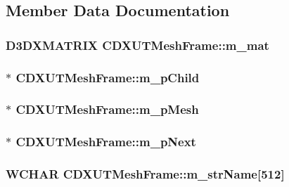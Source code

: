 \subsection{Member Data Documentation}
\hypertarget{class_c_d_x_u_t_mesh_frame_a018ba8d719db33f300d59b99bf0dfd86}{
\subsubsection[{m\_\-mat}]{\setlength{\rightskip}{0pt plus 5cm}D3DXMATRIX {\bf CDXUTMeshFrame::m\_\-mat}}}
\label{class_c_d_x_u_t_mesh_frame_a018ba8d719db33f300d59b99bf0dfd86}
\hypertarget{class_c_d_x_u_t_mesh_frame_afc98448a89a6ac9eb9c9627e557fd37d}{
\subsubsection[{m\_\-pChild}]{$\ast$ {\bf CDXUTMeshFrame::m\_\-pChild}}}
\label{class_c_d_x_u_t_mesh_frame_afc98448a89a6ac9eb9c9627e557fd37d}
\hypertarget{class_c_d_x_u_t_mesh_frame_ade192a1107df2f8cf1463c8c84dbc145}{
\subsubsection[{m\_\-pMesh}]{$\ast$ {\bf CDXUTMeshFrame::m\_\-pMesh}}}
\label{class_c_d_x_u_t_mesh_frame_ade192a1107df2f8cf1463c8c84dbc145}
\hypertarget{class_c_d_x_u_t_mesh_frame_ab462f3935c9bb4308aeb377a225527f7}{
\subsubsection[{m\_\-pNext}]{$\ast$ {\bf CDXUTMeshFrame::m\_\-pNext}}}
\label{class_c_d_x_u_t_mesh_frame_ab462f3935c9bb4308aeb377a225527f7}
\hypertarget{class_c_d_x_u_t_mesh_frame_a7b42eefd652a2b8003644b8637f5209b}{
\subsubsection[{m\_\-strName}]{\setlength{\rightskip}{0pt plus 5cm}WCHAR {\bf CDXUTMeshFrame::m\_\-strName}\mbox{[}512\mbox{]}}}
\label{class_c_d_x_u_t_mesh_frame_a7b42eefd652a2b8003644b8637f5209b}


